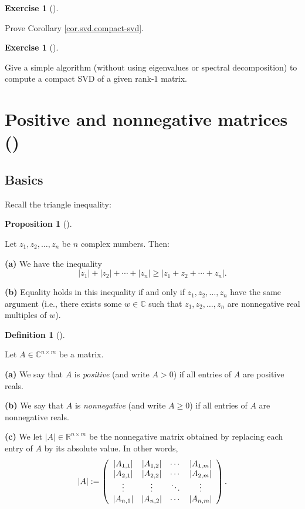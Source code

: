 \documentclass[numbers=enddot,12pt,final,onecolumn,notitlepage]{scrartcl}%
\newcounter{exer}
\numberwithin{exer}{subsection}
\theoremstyle{definition}
\newtheorem{prop}[theo]{Proposition}
\newenvironment{proposition}[1][]
{\begin{prop}[#1]\begin{leftbar}}
{\end{leftbar}\end{prop}}
\newtheorem{defi}[theo]{Definition}
\newenvironment{definition}[1][]
{\begin{defi}[#1]\begin{leftbar}}
{\end{leftbar}\end{defi}}
\newtheorem{exmp}[exer]{Exercise}
\newenvironment{exercise}[1][]
{\begin{exmp}[#1]\begin{leftbar}}
{\end{leftbar}\end{exmp}}
\begin{document}
\begin{exercise}
 Prove Corollary \ref{cor.svd.compact-svd}.
\end{exercise}

\begin{exercise}
 Give a simple algorithm (without using eigenvalues or spectral
decomposition) to compute a compact SVD of a given rank-$1$ matrix.
\end{exercise}

\section{Positive and nonnegative matrices (\cite[Chapter 8]{HorJoh13})}

\subsection{Basics}

Recall the triangle inequality:

\begin{proposition}
[triangle inequality]\label{prop.ineq.triangle-CC}Let $z_{1},z_{2}%
,\ldots,z_{n}$ be $n$ complex numbers. Then: \medskip

\textbf{(a)} We have the inequality%
\[
\left\vert z_{1}\right\vert +\left\vert z_{2}\right\vert +\cdots+\left\vert
z_{n}\right\vert \geq\left\vert z_{1}+z_{2}+\cdots+z_{n}\right\vert .
\]


\textbf{(b)} Equality holds in this inequality if and only if $z_{1}%
,z_{2},\ldots,z_{n}$ have the same argument (i.e., there exists some
$w\in\mathbb{C}$ such that $z_{1},z_{2},\ldots,z_{n}$ are nonnegative real
multiples of $w$).
\end{proposition}

\begin{definition}
\label{def.posmat.pos-nonneg}Let $A\in\mathbb{C}^{n\times m}$ be a matrix. \medskip

\textbf{(a)} We say that $A$ is \emph{positive} (and write $A>0$) if all
entries of $A$ are positive reals. \medskip

\textbf{(b)} We say that $A$ is \emph{nonnegative} (and write $A\geq0$) if all
entries of $A$ are nonnegative reals. \medskip

\textbf{(c)} We let $\left\vert A\right\vert \in\mathbb{R}^{n\times m}$ be the
nonnegative matrix obtained by replacing each entry of $A$ by its absolute
value. In other words,%
\[
\left\vert A\right\vert :=\left(
\begin{array}
[c]{cccc}%
\left\vert A_{1,1}\right\vert  & \left\vert A_{1,2}\right\vert  & \cdots &
\left\vert A_{1,m}\right\vert \\
\left\vert A_{2,1}\right\vert  & \left\vert A_{2,2}\right\vert  & \cdots &
\left\vert A_{2,m}\right\vert \\
\vdots & \vdots & \ddots & \vdots\\
\left\vert A_{n,1}\right\vert  & \left\vert A_{n,2}\right\vert  & \cdots &
\left\vert A_{n,m}\right\vert
\end{array}
\right)  .
\]

\end{definition}
\end{document}
